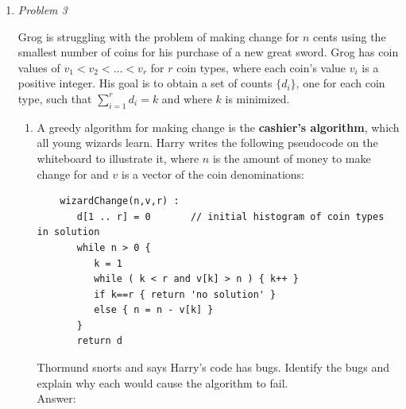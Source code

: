 \documentclass[12pt]{article}
\begin{document}
\begin{enumerate}
    \item \textit{Problem 3}
    
    Grog is struggling with the problem of making change for $n$ cents using the smallest number of coins for his purchase of a new great sword. Grog has coin values of $v_{1}<v_{2}<\dots<v_{r}$ for $r$ coin types, where each coin's value $v_{i}$ is a positive integer. His goal is to obtain a set of counts $\{d_{i}\}$, one for each coin type, such that $\sum_{i=1}^{r}d_{i}=k$ and where $k$ is minimized.\\
    
    \begin{enumerate}
        \item 
        
        A greedy algorithm for making change is the \textbf{cashier's algorithm}, which all young wizards learn. Harry writes the following pseudocode on the whiteboard to illustrate it, where $n$ is the amount of money to make change for and $v$ is a vector of the coin denominations:
	\begin{small}
	\begin{verbatim}
	wizardChange(n,v,r) :
	   d[1 .. r] = 0       // initial histogram of coin types in solution
	   while n > 0 {
	      k = 1
	      while ( k < r and v[k] > n ) { k++ }
	      if k==r { return 'no solution' }
	      else { n = n - v[k] }
	   }
	   return d
	\end{verbatim}
	\end{small}
	Thormund snorts and says Harry's code has bugs. Identify the bugs and explain why each would cause the algorithm to fail.\\
        
        Answer:\\
    

\end{enumerate}
\end{enumerate}
\end{document}
